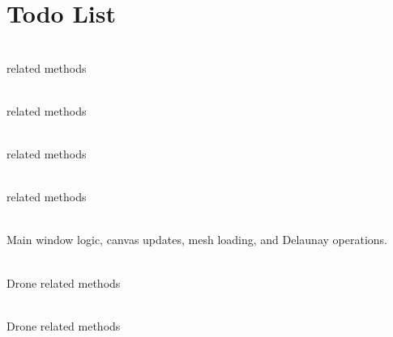 \chapter{Todo List}
\hypertarget{todo}{}\label{todo}

\begin{DoxyRefList}
\item[Class \doxylink{class_canvas}{Canvas} ]\hfill \\
\label{todo__todo000002}%
%
 related methods  
\item[Member \doxylink{class_canvas_aeea65f2bfc2be61bdbcaaa3a67c33185}{Canvas\+::Canvas} (QWidget \texorpdfstring{$\ast$}{*}parent=nullptr)]\hfill \\
\label{todo__todo000001}%
%
 related methods  
\item[Class \doxylink{class_graph}{Graph} ]\hfill \\
\label{todo__todo000007}%
%
 related methods  
\item[Member \doxylink{class_graph_ae4c72b8ac4d693c49800a4c7e273654f}{Graph\+::Graph} ()]\hfill \\
\label{todo__todo000006}%
%
 related methods  
\item[Member \doxylink{class_main_window_a996c5a2b6f77944776856f08ec30858d}{Main\+Window\+::Main\+Window} (QWidget \texorpdfstring{$\ast$}{*}parent=nullptr)]\hfill \\
\label{todo__todo000008}%
%
Main window logic, canvas updates, mesh loading, and Delaunay operations.  
\item[Class \doxylink{classmy_drone}{my\+Drone} ]\hfill \\
\label{todo__todo000005}%
%
Drone related methods  
\item[Member \doxylink{classmy_drone_a8171355dc4b49d1b0aded92ff17409ac}{my\+Drone\+::my\+Drone} (const QString \&name, const QColor \&color, const \doxylink{class_vector2_d}{Vector2D} \&initial\+Position, const QString \&server\+Address)]\hfill \\
\label{todo__todo000004}%
%
Drone related methods  
\item[Class \doxylink{class_my_polygon}{My\+Polygon} ]\hfill \\

\end{DoxyRefList}
